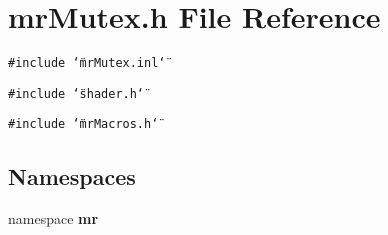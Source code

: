 \section{mr\-Mutex.h File Reference}
\label{mrMutex_8h}
{\tt \#include \char`\"{}mr\-Mutex.inl\char`\"{}}\par
{\tt \#include \char`\"{}shader.h\char`\"{}}\par
{\tt \#include \char`\"{}mr\-Macros.h\char`\"{}}\par
\subsection*{Namespaces}
\begin{CompactItemize}
\item 
namespace {\bf mr}
\end{CompactItemize}
